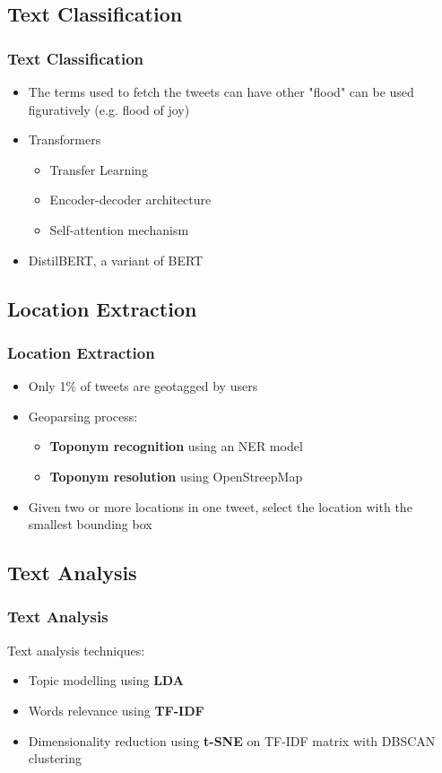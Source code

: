 \documentclass{beamer}
\begin{document}
\subsection{Text Classification}
\begin{frame}[t]
  \frametitle{Text Classification}
  \begin{itemize}
    \item The terms used to fetch the tweets can have other "flood" can be used figuratively (e.g.
      flood of joy)
  \pause
    \item Transformers
      \begin{itemize}
      \item Transfer Learning
      \item Encoder-decoder architecture
      \item Self-attention mechanism
      \end{itemize}
    \item DistilBERT, a variant of BERT
  \end{itemize}
\end{frame}
\subsection{Location Extraction}
\begin{frame}[t]
  \frametitle{Location Extraction}
  \begin{itemize}
    \item Only 1\% of tweets are geotagged by users
      \pause
    \item Geoparsing process:
      \begin{itemize}
        \item \textbf{Toponym recognition} using an NER model
        \item \textbf{Toponym resolution} using OpenStreepMap
      \end{itemize}
    \item Given two or more locations in one tweet, select the location with the smallest bounding box
  \end{itemize}
\end{frame}
\subsection{Text Analysis}
\begin{frame}[t]
  \frametitle{Text Analysis}
      \vspace{0.5cm}
    Text analysis techniques:
      \begin{itemize}
        \item Topic modelling using \textbf{LDA}
        \item Words relevance using \textbf{TF-IDF}
        \item Dimensionality reduction using \textbf{t-SNE} on TF-IDF matrix with DBSCAN clustering
      \end{itemize}
\end{frame}
\end{document}
